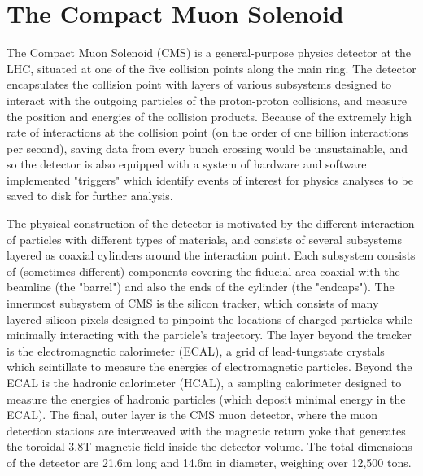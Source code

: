 \section{The Compact Muon Solenoid}
\label{sec:cms}
The Compact Muon Solenoid (CMS) is a general-purpose physics detector at the LHC, situated at one of the five collision points along the main ring. The detector encapsulates the collision point with layers of various subsystems designed to interact with the outgoing particles of the proton-proton collisions, and measure the position and energies of the collision products. Because of the extremely high rate of interactions at the collision point (on the order of one billion interactions per second), saving data from every bunch crossing would be unsustainable, and so the detector is also equipped with a system of hardware and software implemented "triggers" which identify events of interest for physics analyses to be saved to disk for further analysis.

The physical construction of the detector is motivated by the different interaction of particles with different types of materials, and consists of several subsystems layered as coaxial cylinders around the interaction point. Each subsystem consists of (sometimes different) components covering the fiducial area coaxial with the beamline (the "barrel") and also the ends of the cylinder (the "endcaps"). The innermost subsystem of CMS is the silicon tracker, which consists of many layered silicon pixels designed to pinpoint the locations of charged particles while minimally interacting with the particle's trajectory. The layer beyond the tracker is the electromagnetic calorimeter (ECAL), a grid of lead-tungstate crystals which scintillate to measure the energies of electromagnetic particles. Beyond the ECAL is the hadronic calorimeter (HCAL), a sampling calorimeter designed to measure the energies of hadronic particles (which deposit minimal energy in the ECAL). The final, outer layer is the CMS muon detector, where the muon detection stations are interweaved with the magnetic return yoke that generates the toroidal 3.8T magnetic field inside the detector volume. The total dimensions of the detector are 21.6m long and 14.6m in diameter, weighing over 12,500 tons.

